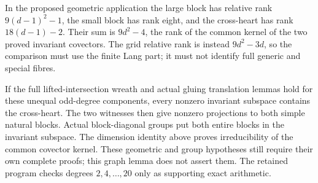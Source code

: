 \begin{remark}\label{rem:root-even-mixed-grid-assembly-candidate}
In the proposed geometric application the large block has
relative rank $9(d-1)^2-1$, the small block has rank eight,
and the cross-heart has rank $18(d-1)-2$. Their sum is
$9d^2-4$, the rank of the common kernel of the two proved
invariant covectors. The grid relative rank is instead
$9d^2-3d$, so the comparison must use the finite Lang part;
it must not identify full generic and special fibres.

If the full lifted-intersection wreath and actual gluing
translation lemmas hold for these unequal odd-degree
components, every nonzero invariant subspace contains the
cross-heart. The two witnesses then give nonzero projections
to both simple natural blocks. Actual block-diagonal groups
put both entire blocks in the invariant subspace. The dimension
identity above proves irreducibility of the common covector
kernel. These geometric and group hypotheses still require
their own complete proofs; this graph lemma does not assert them.
The retained program 
checks degrees $2,4,\ldots,20$ only as supporting exact arithmetic.
\end{remark}

